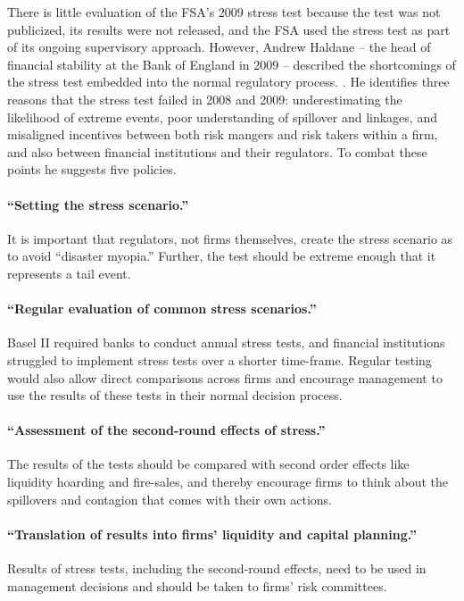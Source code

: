 \documentclass[12pt]{article}
\begin{document}
There is little evaluation of the FSA's 2009 stress test because the test was not publicized, its results were not released, and the FSA used the stress test as part of its ongoing supervisory approach. However, Andrew Haldane -- the head of financial stability at the Bank of England in 2009 -- described the shortcomings of the stress test embedded into the normal regulatory process. \citep{Haldane}. He identifies three reasons that the stress test failed in 2008 and 2009: underestimating the likelihood of extreme events, poor understanding of spillover and linkages, and misaligned incentives between both risk mangers and risk takers within a firm, and also between financial institutions and their regulators. To combat these points he suggests five policies.

\paragraph{``Setting the stress scenario.''} It is important that regulators, not firms themselves, create the stress scenario as to avoid ``disaster myopia.'' Further, the test should be extreme enough that it represents a tail event.

\paragraph{``Regular evaluation of common stress scenarios.''} Basel II required banks to conduct annual stress tests, and financial institutions struggled to implement stress tests over a shorter time-frame. Regular testing would also allow direct comparisons across firms and encourage management to use the results of these tests in their normal decision process.

\paragraph{``Assessment of the second-round effects of stress.''} The results of the tests should be compared with second order effects like liquidity hoarding and fire-sales, and thereby encourage firms to think about the spillovers and contagion that comes with their own actions.

\paragraph{``Translation of results into firms' liquidity and capital planning.''} Results of stress tests, including the second-round effects, need to be used in management decisions and should be taken to firms' risk committees.
\end{document}
